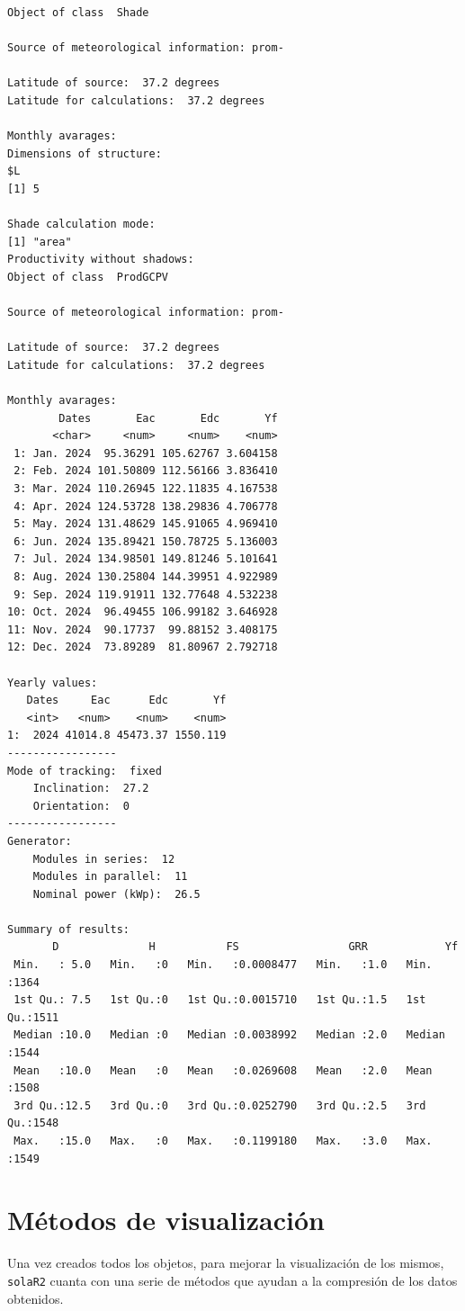 \begin{verbatim}
Object of class  Shade 

Source of meteorological information: prom- 

Latitude of source:  37.2 degrees
Latitude for calculations:  37.2 degrees

Monthly avarages:
Dimensions of structure:
$L
[1] 5

Shade calculation mode:
[1] "area"
Productivity without shadows:
Object of class  ProdGCPV 

Source of meteorological information: prom- 

Latitude of source:  37.2 degrees
Latitude for calculations:  37.2 degrees

Monthly avarages:
        Dates       Eac       Edc       Yf
       <char>     <num>     <num>    <num>
 1: Jan. 2024  95.36291 105.62767 3.604158
 2: Feb. 2024 101.50809 112.56166 3.836410
 3: Mar. 2024 110.26945 122.11835 4.167538
 4: Apr. 2024 124.53728 138.29836 4.706778
 5: May. 2024 131.48629 145.91065 4.969410
 6: Jun. 2024 135.89421 150.78725 5.136003
 7: Jul. 2024 134.98501 149.81246 5.101641
 8: Aug. 2024 130.25804 144.39951 4.922989
 9: Sep. 2024 119.91911 132.77648 4.532238
10: Oct. 2024  96.49455 106.99182 3.646928
11: Nov. 2024  90.17737  99.88152 3.408175
12: Dec. 2024  73.89289  81.80967 2.792718

Yearly values:
   Dates     Eac      Edc       Yf
   <int>   <num>    <num>    <num>
1:  2024 41014.8 45473.37 1550.119
-----------------
Mode of tracking:  fixed 
    Inclination:  27.2 
    Orientation:  0 
-----------------
Generator:
    Modules in series:  12 
    Modules in parallel:  11 
    Nominal power (kWp):  26.5 

Summary of results:
       D              H           FS                 GRR            Yf      
 Min.   : 5.0   Min.   :0   Min.   :0.0008477   Min.   :1.0   Min.   :1364  
 1st Qu.: 7.5   1st Qu.:0   1st Qu.:0.0015710   1st Qu.:1.5   1st Qu.:1511  
 Median :10.0   Median :0   Median :0.0038992   Median :2.0   Median :1544  
 Mean   :10.0   Mean   :0   Mean   :0.0269608   Mean   :2.0   Mean   :1508  
 3rd Qu.:12.5   3rd Qu.:0   3rd Qu.:0.0252790   3rd Qu.:2.5   3rd Qu.:1548  
 Max.   :15.0   Max.   :0   Max.   :0.1199180   Max.   :3.0   Max.   :1549
\end{verbatim}

\section{Métodos de visualización}
\label{sec:orga2a34b1}
\label{sec:metodos-visualizacion}
Una vez creados todos los objetos, para mejorar la visualización de los mismos, \texttt{solaR2} cuanta con una serie de métodos que ayudan a la compresión de los datos obtenidos.

